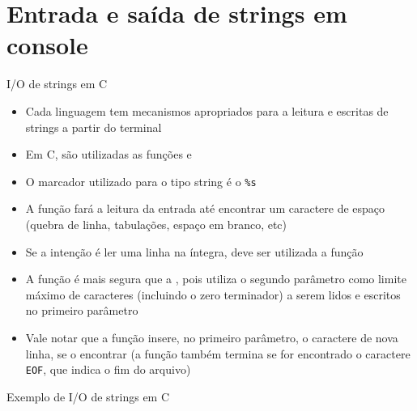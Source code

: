 \section{Entrada e saída de strings em console}

\begin{frame}[fragile]{I/O de strings em C}

    \begin{itemize}
        \item Cada linguagem tem mecanismos apropriados para a leitura e escritas de strings a partir do terminal
        \pause

        \item Em C, são utilizadas as funções  e 
        \pause

        \item O marcador utilizado para o tipo string é o \verb|%s|
        \pause

        \item A função  fará a leitura da entrada até encontrar um caractere de 
            espaço (quebra de linha, tabulações, espaço em branco, etc)
        \pause

        \item Se a intenção é ler uma linha na íntegra, deve ser utilizada a função 
        \pause

        \item A função  é mais segura que a , pois utiliza o 
            segundo parâmetro como limite máximo de caracteres (incluindo o zero terminador) a serem 
            lidos e escritos no primeiro parâmetro
        \pause

        \item Vale notar que a função  insere, no primeiro parâmetro, o caractere 
            de nova linha, se o encontrar (a função também termina se for encontrado o caractere 
            \texttt{EOF}, que indica o fim do arquivo)
    \end{itemize}

\end{frame}

\begin{frame}[fragile]{Exemplo de I/O de strings em C}
\end{frame}

